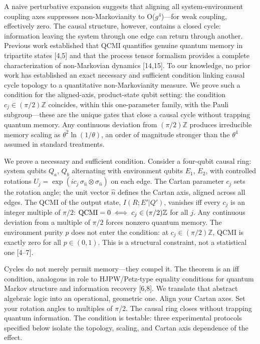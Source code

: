 \documentclass[twocolumn,aps,prl,floatfix]{revtex4-2}
\begin{document}
A naive perturbative expansion suggests that aligning all system-environment coupling axes suppresses non-Markovianity to O($g^4$)---for weak coupling, effectively zero. The causal structure, however, contains a closed cycle: information leaving the system through one edge can return through another. Previous work established that QCMI quantifies genuine quantum memory in tripartite states [4,5] and that the process tensor formalism provides a complete characterization of non-Markovian dynamics [14,15]. To our knowledge, no prior work has established an exact necessary and sufficient condition linking causal cycle topology to a quantitative non-Markovianity measure. We prove such a condition for the aligned-axis, product-state qubit setting: the condition $c_j\in(\pi/2)\mathbb{Z}$ coincides, within this one-parameter family, with the Pauli subgroup---these are the unique gates that close a causal cycle without trapping quantum memory. Any continuous deviation from $(\pi/2)\mathbb{Z}$ produces irreducible memory scaling as $\theta^2\ln(1/\theta)$, an order of magnitude stronger than the $\theta^4$ assumed in standard treatments.

We prove a necessary and sufficient condition. Consider a four-qubit causal ring: system qubits $Q_a$, $Q_b$ alternating with environment qubits $E_1$, $E_2$, with controlled rotations $U_j = \exp(i c_j\,\sigma_{\hat{n}}\otimes\sigma_{\hat{n}})$ on each edge. The Cartan parameter $c_j$ sets the rotation angle; the unit vector $\hat{n}$ defines the Cartan axis, aligned across all edges. The QCMI of the output state, $I(R;E'|Q')$, vanishes iff every $c_j$ is an integer multiple of $\pi/2$: ${\rm QCMI}=0\iff c_j\in(\pi/2)\mathbb{Z}$ for all $j$. Any continuous deviation from a multiple of $\pi/2$ forces nonzero quantum memory. The environment purity $p$ does not enter the condition: at $c_j\in(\pi/2)\mathbb{Z}$, QCMI is exactly zero for all $p\in(0,1)$. This is a structural constraint, not a statistical one [4--7].

Cycles do not merely permit memory—they compel it. The theorem is an iff condition, analogous in role to HJPW/Petz-type equality conditions for quantum Markov structure and information recovery [6,8]. We translate that abstract algebraic logic into an operational, geometric one. Align your Cartan axes. Set your rotation angles to multiples of $\pi$/2. The causal ring closes without trapping quantum information. The condition is testable: three experimental protocols specified below isolate the topology, scaling, and Cartan axis dependence of the effect.
\end{document}
